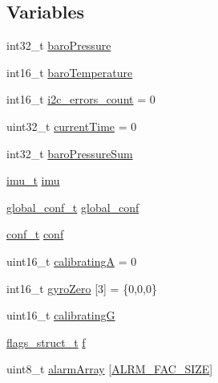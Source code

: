 \subsection*{Variables}
\begin{DoxyCompactItemize}
\item 
int32\-\_\-t \hyperlink{Uno__MultiWii__HardwarePlatform__Test_8ino_ac81b1e91a0237f3e34d840f09ae0dfde}{baro\-Pressure}
\item 
int16\-\_\-t \hyperlink{Uno__MultiWii__HardwarePlatform__Test_8ino_a532d6b73f92629f21588373dc77471c2}{baro\-Temperature}
\item 
int16\-\_\-t \hyperlink{Uno__MultiWii__HardwarePlatform__Test_8ino_a1763e7b6b295f92e5728fa978da597bf}{i2c\-\_\-errors\-\_\-count} = 0
\item 
uint32\-\_\-t \hyperlink{Uno__MultiWii__HardwarePlatform__Test_8ino_ad4c3dbcb408adf7386297aac9025571a}{current\-Time} = 0
\item 
int32\-\_\-t \hyperlink{Uno__MultiWii__HardwarePlatform__Test_8ino_aac31d5df4bea51f0fc5bdc8949cb13d6}{baro\-Pressure\-Sum}
\item 
\hyperlink{structimu__t}{imu\-\_\-t} \hyperlink{Uno__MultiWii__HardwarePlatform__Test_8ino_a16b6f6c7ef9a694549b8a7194915a85a}{imu}
\item 
\hyperlink{structglobal__conf__t}{global\-\_\-conf\-\_\-t} \hyperlink{Uno__MultiWii__HardwarePlatform__Test_8ino_a50203b063666e990c9ce0f3746287350}{global\-\_\-conf}
\item 
\hyperlink{structconf__t}{conf\-\_\-t} \hyperlink{Uno__MultiWii__HardwarePlatform__Test_8ino_a40e427255962e28d8913a56db7b748b8}{conf}
\item 
uint16\-\_\-t \hyperlink{Uno__MultiWii__HardwarePlatform__Test_8ino_ab47f4a30e3b43729e2445484a281c8f0}{calibrating\-A} = 0
\item 
int16\-\_\-t \hyperlink{Uno__MultiWii__HardwarePlatform__Test_8ino_add9c7df8ad90d5dbd11fccafddf9b437}{gyro\-Zero} \mbox{[}3\mbox{]} = \{0,0,0\}
\item 
uint16\-\_\-t \hyperlink{Uno__MultiWii__HardwarePlatform__Test_8ino_abab9a25bbfcc5774943e3210673574b9}{calibrating\-G}
\item 
\hyperlink{structflags__struct__t}{flags\-\_\-struct\-\_\-t} \hyperlink{Uno__MultiWii__HardwarePlatform__Test_8ino_aa27fc5a637b915f1bff5f1f75a0455ab}{f}
\item 
uint8\-\_\-t \hyperlink{Uno__MultiWii__HardwarePlatform__Test_8ino_ab7177fe420fbe971863c278be8d943c0}{alarm\-Array} \mbox{[}\hyperlink{Uno__MultiWii__HardwarePlatform__Test_2Alarms_8h_ad582dbb8c94e647a50e104dbb64f68a3ab5af4495b6951e3bcec850f0f4433b2f}{A\-L\-R\-M\-\_\-\-F\-A\-C\-\_\-\-S\-I\-Z\-E}\mbox{]}
\end{DoxyCompactItemize}


